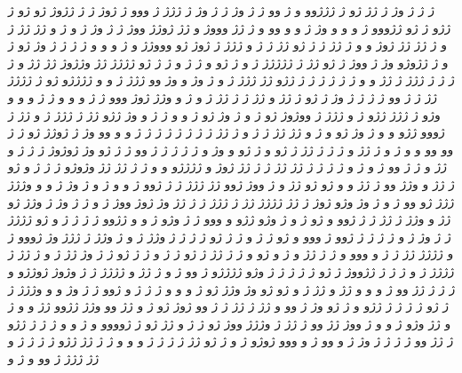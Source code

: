 \documentclass[a4paper]{article}
\begin{document}
ژ ژ ژ وژ ژ ژژ ژو ژ ژژژوو و ژ وو ژ ژ وژ ژ ژ وژ ژ ژژژ ژ ووو ژ ژوژ ژ ژ ژژوژ ژو ژو ژ ژژو ژ ژو ژژووو ژ و و و وژ ژ و و وو و ژ ژژ وووژ و ژژ ژوژژ ووژ ژ ژ وژ ژ و ژ و ژژ ژژ ژ و ژ ژژ ژژ ژوژ و و ژ ژژ ژ ژ ژو ژژ ژ ژ و ژژژ ژ ژوژ ژو وووژژ و ژ و و و ژ ژ ژ ژ وژ ژو ژ و ژ ژژوژو وژ ژ ووژ ژ ژو ژژ ژ ژژژژژ ژ و ژ ژو و ژ ژ و ژ ژ ژو ژژژژ ژژ وژژوژ ژژ ژژ و ژ ژ ژ ژ ژژژ ژ ژژ و و ژ ژ ژ ژ ژ ژ ژژو ژژ ژژژ ژ و ژ وژ و وژ وو ژژژ ژ و و ژژژژو ژو ژ ژژژژ ژژ ژ ژ وو ژ ژ ژ ژ وژ ژ ژو ژ ژژ و ژژ ژ ژ ژژ ژ و ژ و وژژ ژوژ ووو ژ ژ و و و ژ ژ و و و وژو ژ ژژژ ژژو ژ و ژژژ ژ ووژوژ ژو ژ و ژ وژ ژو ژ و و ژ ژ و وژ ژژو ژژ ژ ژژژ ژ و ژژ ژ ژووو ژژو و و ژ وژ ژو و ژ و ژژ ژژ ژ ژ و ژ ژژ ژ ژ ژ ژ ژ ژ ژ ژ و و وو وژ ژ ژوژژ ژو ژ ژ وو وو و و ژ و ژ ژژ و ژ ژ ژ ژژ ژ ژو و ژ ژو و وژ و ژ ژ ژ ژ ژ وو ژ ژ ژو وژ ژوژوژ ژ ژ ژ و ژژ و ژ ژ وو ژ و ژ و ژ ژ ژ ژ ژژ ژژ ژ ژ ژژ ژوژ و ژژژژو و و ژ ژ ژژ ژژ وژوژو ژ ژ ژ و ژو ژ ژژ و وژژ وو ژ ژژ و و ژو ژو ژژ و ژ ووژ ژوو ژژ ژژژ ژ ژ ژوو ژ و و ژ و ژ وژ ژ و و وژژژ ژژژ ژو وو ژ و ژ وژ وژو ژوژ ژ ژژ ژژژژ ژژ ژ ژژژ ژ ژ ژژ وژ ژوژ ووژ ژ و ژ ژ وژ ژ وژژ ژو ژژ و وژژ ژ ژژ ژ ژ ژوو و ژو ژ و ژ وژو ژژو و ووو ژ ژ وژو ژ و و ژژوو ژ ژ ژ ژ و ژو ژژژژ ژ ژ وژ ژ و ژ ژ ژ ژ ژوو ژ ووو و ژو ژ ژ و ژ ژ ژو ژ ژ ژ ژ وژژ ژ و ژ وژژ ژ ژژژ وژ ژووو ژ و ژژژژ ژژ ژ ژ و ووو و ژ ژ ژژ و ژ و ژو و ژ ژ ژژ ژ ژو ژ ژ و ژ ژ ژو ژ ژ وژ ژژ ژ و ژ ژژ ژ ژژژژ ژ و ژ ژ ژ ژژووژ ژ ژو ژ ژ ژ ژ ژ وژو ژژژژو ژ وو ژ و ژ ژژ و ژژژژ ژ ژ وژوژ ژوژژو و ژ ژ ژ ژژ وو ژ و و و ژژ و ژژ ژ و ژو ژو وژ وژژ ژو ژ و و و ژ ژ ژ و ژوو ژ ژ وژ و و وژژژ ژ ژ ژو ژ ژ ژ ژ ژژو و ژ ژو وژ ژ وو و ژژ ژ ژژ ژ ژ وو ژوژ ژو ژ و ژژ وو وژژ ژژوو ژژ و و ژ و ژژ وژو ژ و و ژ ووژ ژژ وو ژ ژژ ژ وژژژ ووژ ژو ژ ژ و ژژ ژو ژ ژوووو و ژ و و ژ ژ ژ ژژو ژ ژژ وو ژ ژ ژ ژ وژ ژ و وو ژ و ووو ژوژو ژ و ژ ژو ژژ ژ ژ ژ ژ و و و ژ ژ ژژ ژژو ژ ژ ژ ژ و ژژ ژژژ ژ وو و ژ و
\end{document}
